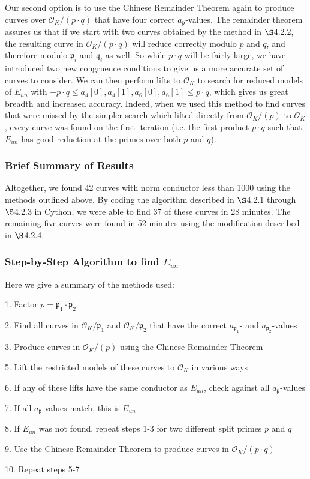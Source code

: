 Our second option is to use the Chinese Remainder Theorem again to produce curves over $\mathcal{O}_K/(p\cdot q)$ that have four correct $a_\mathfrak{p}$-values. The remainder theorem assures us that if we start with two curves obtained by the method in $\S$4.2.2, the resulting curve in $\mathcal{O}_K/(p\cdot q)$ will reduce correctly modulo $p$ and $q$, and therefore modulo $\mathfrak{p}_i$ and $\mathfrak{q}_i$ as well. So while $p\cdot q$ will be fairly large, we have introduced two new congruence conditions to give us a more accurate set of curves to consider. We can then perform lifts to $\mathcal{O}_K$ to search for reduced models of $E_{un}$ with $-p\cdot q \leq a_4[0], a_4[1], a_6[0], a_6[1] \leq p\cdot q$, which gives us great breadth and increased accuracy. Indeed, when we used this method to find curves that were missed by the simpler search which lifted directly from $\mathcal{O}_K/(p)$ to $\mathcal{O}_K$, every curve was found on the first iteration (i.e. the first product $p\cdot q$ such that $E_{un}$ has good reduction at the primes over both $p$ and $q$).

\subsubsection{Brief Summary of Results}

Altogether, we found 42 curves with norm conductor less than 1000 using the methods outlined above. By coding the algorithm described in $\S$4.2.1 through $\S$4.2.3 in Cython, we were able to find 37 of these curves in 28 minutes. The remaining five curves were found in 52 minutes using the modification described in $\S$4.2.4.

\subsubsection{Step-by-Step Algorithm to find $E_{un}$}

Here we give a summary of the methods used:

1. Factor $p = \mathfrak{p}_1 \cdot \mathfrak{p}_2$

2. Find all curves in $\mathcal{O}_K/\mathfrak{p}_1$ and $\mathcal{O}_K/\mathfrak{p}_2$ that have the correct $a_{\mathfrak{p}_1}$- and $a_{\mathfrak{p}_2}$-values

3. Produce curves in $\mathcal{O}_K/(p)$ using the Chinese Remainder Theorem

5. Lift the restricted models of these curves to $\mathcal{O}_K$ in various ways

6. If any of these lifts have the same conductor as $E_{un}$, check against all $a_\mathfrak{p}$-values

7. If all $a_\mathfrak{p}$-values match, this is $E_{un}$

8. If $E_{un}$ was not found, repeat steps 1-3 for two different split primes $p$ and $q$

9. Use the Chinese Remainder Theorem to produce curves in $\mathcal{O}_K/(p\cdot q)$

10. Repeat steps 5-7